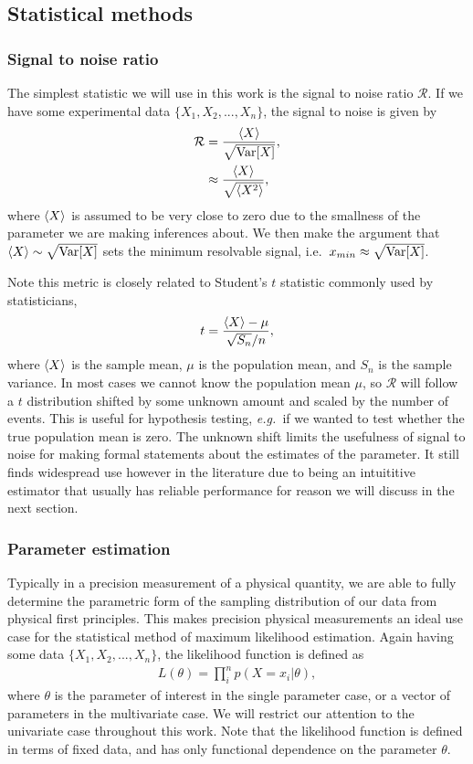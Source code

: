 \subsection{Statistical methods}
\subsubsection{Signal to noise ratio}
The simplest statistic we will use in this work is the signal to noise ratio $\mathcal{R}$.  If we have some experimental data $\{X_1, X_2,..., X_n\}$, the signal to noise is given by
\begin{align}
  \nonumber  \mathcal{R} &= \frac{\left\langle X \right\rangle}{\sqrt{{\rm {Var}}[X]}}, \\
                         &\approx \frac{\left\langle X \right\rangle}{\sqrt{\left\langle X^2 \right\rangle}}, 
\end{align}
where $\left\langle X \right\rangle$ is assumed to be very close to zero due to the smallness of the parameter we are making inferences about.  We then make the argument that $\left\langle X \right\rangle \sim \sqrt{{\rm {Var}}[X]}$ sets the minimum resolvable signal, i.e.~$x_{min} \approx \sqrt{{\rm {Var}}[X]}$.  

Note this metric is closely related to Student's $t$ statistic commonly used by statisticians,
\begin{align}
  t = \frac{\left\langle X \right\rangle - \mu}{\sqrt{S_n}/n},
\end{align}
where $\left\langle X \right\rangle$ is the sample mean, $\mu$ is the population mean, and $S_n$ is the sample variance.  In most cases we cannot know the population mean $\mu$, so $\mathcal{R}$ will follow a $t$ distribution shifted by some unknown amount and scaled by the number of events.  This is useful for hypothesis testing, \emph{e.g.~}if we wanted to test whether the true population mean is zero.  The unknown shift limits the usefulness of signal to noise for making formal statements about the estimates of the parameter.  It still finds widespread use however in the literature due to being an intuititive estimator that usually has reliable performance for reason we will discuss in the next section.  

\subsubsection{Parameter estimation}
Typically in a precision measurement of a physical quantity, we are able to fully determine the parametric form of the sampling distribution of our data from physical first principles.  This makes precision physical measurements an ideal use case for the statistical method of maximum likelihood estimation.  Again having some data $\{X_1, X_2,..., X_n\}$, the likelihood function is defined as
\begin{align}\label{eq:likelihood function}
  L(\theta) = \prod^n_i p(X=x_i|\theta),
\end{align}
where $\theta$ is the parameter of interest in the single parameter case, or a vector of parameters in the multivariate case.  We will restrict our attention to the univariate case throughout this work.  Note that the likelihood function is defined in terms of fixed data, and has only functional dependence on the parameter $\theta$.

